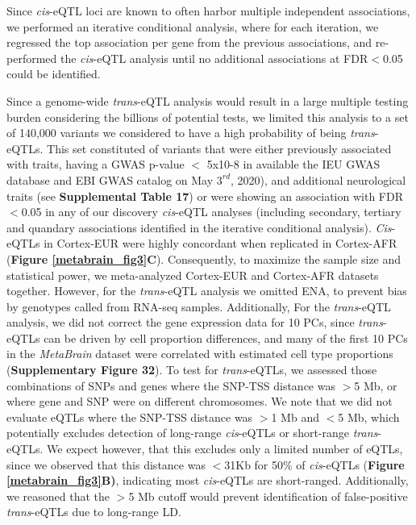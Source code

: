 Since \textit{cis}-eQTL loci are known to often harbor multiple independent associations, we performed an iterative conditional analysis, where for each iteration, we regressed the top association per gene from the previous associations, and re-performed the \textit{cis}-eQTL analysis until no additional associations at FDR$<$0.05 could be identified. 

Since a genome-wide \textit{trans}-eQTL analysis would result in a large multiple testing burden considering the billions of potential tests, we limited this analysis to a set of 140,000 variants we considered to have a high probability of being \textit{trans}-eQTLs. This set constituted of variants that were either previously associated with traits, having a GWAS p-value $<$ 5x10-8 in available the IEU GWAS database\cite{lyonVariantCallFormat2020} and EBI GWAS catalog\cite{bunielloNHGRIEBIGWASCatalog2019} on May $3^{rd}$, 2020), and additional neurological traits (see \textbf{Supplemental Table 17}) or were showing an association with FDR$<$0.05 in any of our discovery \textit{cis}-eQTL analyses (including secondary, tertiary and quandary associations identified in the iterative conditional analysis).  \textit{Cis}-eQTLs in Cortex-EUR were highly concordant when replicated in Cortex-AFR (\textbf{Figure \ref{metabrain_fig3}C}). Consequently, to maximize the sample size and statistical power, we meta-analyzed Cortex-EUR and Cortex-AFR datasets together. However, for the \textit{trans}-eQTL analysis we omitted ENA, to prevent bias by genotypes called from RNA-seq samples. Additionally, For the \textit{trans}-eQTL analysis, we did not correct the gene expression data for 10 PCs, since \textit{trans}-eQTLs can be driven by cell proportion differences\cite{vosaUnravelingPolygenicArchitecture2018}, and many of the first 10 PCs in the \textit{MetaBrain}  dataset were correlated with estimated cell type proportions (\textbf{Supplementary Figure 32}). To test for \textit{trans}-eQTLs, we assessed those combinations of SNPs and genes where the SNP-TSS distance was $>$5 Mb, or where gene and SNP were on different chromosomes. We note that we did not evaluate eQTLs where the SNP-TSS distance was $>$1 Mb and $<$5 Mb, which potentially excludes detection of long-range \textit{cis}-eQTLs or short-range \textit{trans}-eQTLs. We expect however, that this excludes only a limited number of eQTLs, since we observed that this distance was $<$31Kb for 50\% of \textit{cis}-eQTLs (\textbf{Figure \ref{metabrain_fig3}B)}, indicating most \textit{cis}-eQTLs are short-ranged. Additionally, we reasoned that the $>$5 Mb cutoff would prevent identification of false-positive \textit{trans}-eQTLs due to long-range LD.  

